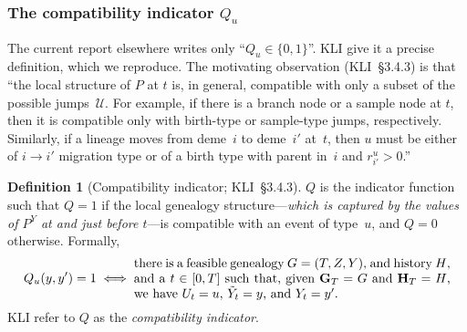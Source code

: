 \documentclass[11pt,leqno]{article}
\newcommand{\Gr}{\mathbf{G}}        %
\newcommand{\Hr}{\mathbf{H}}        %
\newcommand{\Jumps}{\mathcal{U}}    %
\theoremstyle{plain}
\theoremstyle{definition}
\newtheorem{definition}[theorem]{Definition}
\begin{document}
\subsubsection{The compatibility indicator $Q_u$}
\label{sec:Q}

The current report elsewhere writes only ``$Q_u \in \{0,1\}$''.  KLI
give it a precise definition, which we reproduce.  The motivating
observation (KLI~\S3.4.3) is that ``the local structure of $P$ at $t$
is, in general, compatible with only a subset of the possible
jumps~$\Jumps$.  For example, if there is a branch node or a sample
node at $t$, then it is compatible only with birth-type or
sample-type jumps, respectively.  Similarly, if a lineage moves from
deme~$i$ to deme~$i'$ at~$t$, then $u$ must be either of
$i \to i'$ migration type or of a birth type with parent in~$i$ and
$r^u_{i'} > 0$.''

\begin{definition}[Compatibility indicator; KLI~\S3.4.3]
\label{def:Q}
$Q$ is the indicator function such that $Q = 1$ if the local
genealogy structure---\emph{which is captured by the values of $P^Y$ at
and just before $t$}---is compatible with an event of type~$u$, and
$Q = 0$ otherwise.  Formally,
\[
  Q_u(y, y') = 1
  \iff
  \begin{minipage}{0.72\textwidth}
  there is a feasible genealogy $G = (T,Z,Y)$, and history~$H$, and a
  $t \in [0,T]$ such that, given $\Gr_T = G$ and $\Hr_T = H$, we have
  $U_t = u$, $\tilde{Y}_t = y$, and $Y_t = y'$.
  \end{minipage}
\]
KLI refer to $Q$ as the \emph{compatibility indicator}.
\end{definition}
\end{document}
